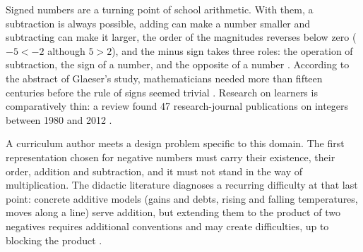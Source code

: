 \documentclass[11pt,a4paper]{article}
\theoremstyle{definition}
\begin{document}
Signed numbers are a turning point of school arithmetic. With them, a subtraction is always possible, adding can make a number smaller and subtracting can make it larger, the order of the magnitudes reverses below zero ($-5<-2$ although $5>2$), and the minus sign takes three roles: the operation of subtraction, the sign of a number, and the opposite of a number \citep{Vlassis2004,Vlassis2008,Lamb2012}. According to the abstract of Glaeser's study, mathematicians needed more than fifteen centuries before the rule of signs seemed trivial \citep{Glaeser1981}. Research on learners is comparatively thin: a review found 47 research-journal publications on integers between 1980 and 2012 \citep{Bishop2014}.

A curriculum author meets a design problem specific to this domain. The first representation chosen for negative numbers must carry their existence, their order, addition and subtraction, and it must not stand in the way of multiplication. The didactic literature diagnoses a recurring difficulty at that last point: concrete additive models (gains and debts, rising and falling temperatures, moves along a line) serve addition, but extending them to the product of two negatives requires additional conventions and may create difficulties, up to blocking the product \citep{Glaeser1981,IREMAquitaine2008,Eduscol2016Relatifs,Matheron2016,Gliere2025}.
\end{document}
